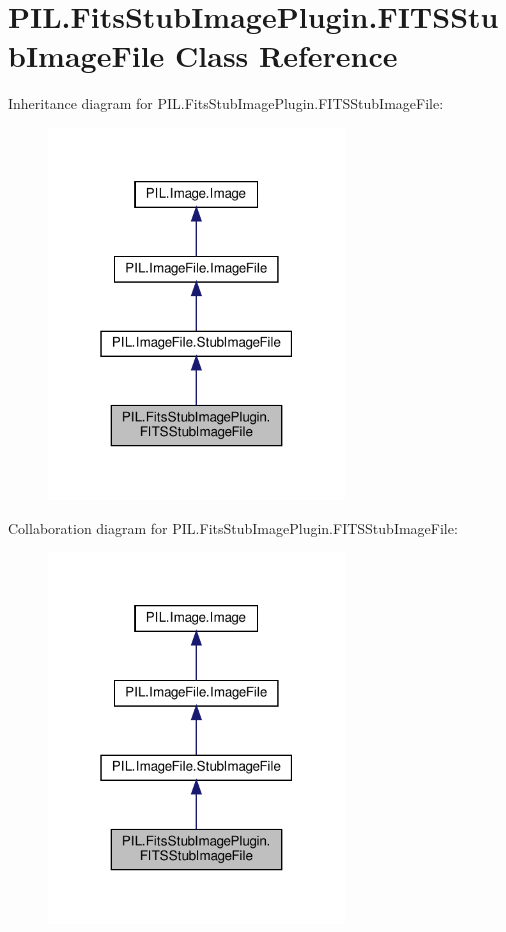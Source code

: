 \hypertarget{classPIL_1_1FitsStubImagePlugin_1_1FITSStubImageFile}{}\section{P\+I\+L.\+Fits\+Stub\+Image\+Plugin.\+F\+I\+T\+S\+Stub\+Image\+File Class Reference}
\label{classPIL_1_1FitsStubImagePlugin_1_1FITSStubImageFile}


Inheritance diagram for P\+I\+L.\+Fits\+Stub\+Image\+Plugin.\+F\+I\+T\+S\+Stub\+Image\+File\+:
\nopagebreak
\begin{figure}[H]
\begin{center}
\leavevmode
\includegraphics[width=223pt]{classPIL_1_1FitsStubImagePlugin_1_1FITSStubImageFile__inherit__graph}
\end{center}
\end{figure}


Collaboration diagram for P\+I\+L.\+Fits\+Stub\+Image\+Plugin.\+F\+I\+T\+S\+Stub\+Image\+File\+:
\nopagebreak
\begin{figure}[H]
\begin{center}
\leavevmode
\includegraphics[width=223pt]{classPIL_1_1FitsStubImagePlugin_1_1FITSStubImageFile__coll__graph}
\end{center}
\end{figure}
